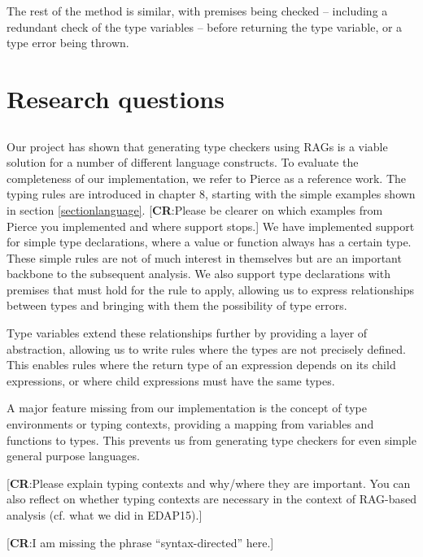 \documentclass[nofilelist]{cslthse-msc}
\newcommand{\CR}[1]{\textcolor{green!60!black}{[\textbf{CR}:#1]}}
\begin{document}
The rest of the method is similar, with premises being checked -- including a redundant check of the type variables -- before returning the type variable, or a type error being thrown.

\section{Research questions}

\subsection{\rqone}
Our project has shown that generating type checkers using RAGs is a viable solution for a number of different language constructs.
To evaluate the completeness of our implementation, we refer to Pierce\cite{Pierce} as a reference work.
The typing rules are introduced in chapter 8, starting with the simple examples shown in section \ref{sectionlanguage}.
\CR{Please be clearer on which examples from Pierce you implemented and where support stops.}
We have implemented support for simple type declarations, where a value or function always has a certain type.
These simple rules are not of much interest in themselves but are an important backbone to the subsequent analysis.
We also support type declarations with premises that must hold for the rule to apply, allowing us to express relationships between types and bringing with them the possibility of type errors.

Type variables extend these relationships further by providing a layer of abstraction, allowing us to write rules where the types are not precisely defined.
This enables rules where the return type of an expression depends on its child expressions, or where child expressions must have the same types.

A major feature missing from our implementation is the concept of type environments or typing contexts, providing a mapping from variables and functions to types.
This prevents us from generating type checkers for even simple general purpose languages.

\CR{Please explain typing contexts and why/where they are important.  You can also reflect on whether typing contexts are necessary in the context of RAG-based analysis (cf. what we did in EDAP15).}

\CR{I am missing the phrase ``syntax-directed'' here.}
\end{document}
